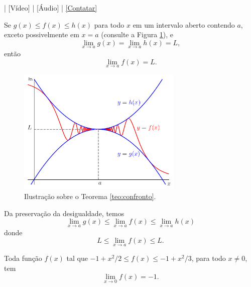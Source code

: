 \begin{flushright}
  [YouTube] | [Vídeo] | [Áudio] | \href{https://phkonzen.github.io/notas/contato.html}{[Contatar]}
\end{flushright}

\begin{teo}\label{teo:confronto}
  Se $g(x) \leq f(x) \leq h(x)$ para todo $x$ em um intervalo aberto contendo $a$, exceto possivelmente em $x=a$ (consulte a Figura \ref{fig:limSanduiche}), e
  \begin{equation}
    \lim_{x\to a} g(x) = \lim_{x\to a} h(x) = L,
  \end{equation}
  então
  \begin{equation}
    \lim_{x\to a} f(x) = L.
  \end{equation}
\end{teo}

\begin{figure}[H]
  \centering
  \includegraphics[width=0.7\textwidth]{./cap_lim/dados/figLimSanduiche/fig}
  \caption{Ilustração sobre o Teorema \ref{teo:confronto}.}
  \label{fig:limSanduiche}
\end{figure}

\begin{dem}
  Da preservação da desigualdade, temos
  \begin{equation}
    \lim_{x\to a} g(x) \leq \lim_{x\to a} f(x) \leq \lim_{x\to a} h(x)
  \end{equation}
  donde
  \begin{equation}
    L \leq \lim_{x\to a} f(x) \leq L.
  \end{equation}
\end{dem}

\begin{ex}
  Toda função $f(x)$ tal que $-1+x^2/2 \leq f(x) \leq -1+x^2/3$, para todo $x\neq 0$, tem
  \begin{equation}
    \lim_{x\to 0} f(x) = -1.
  \end{equation}
\end{ex}

